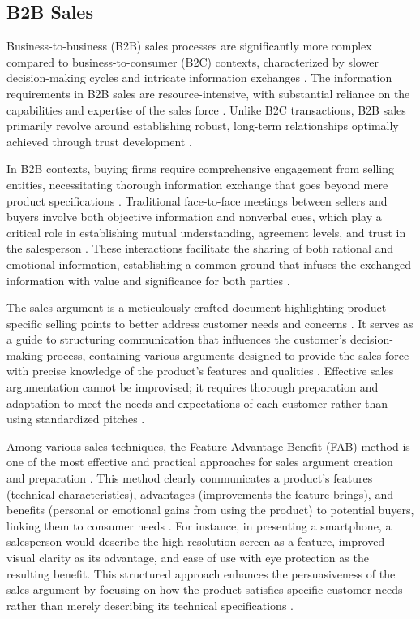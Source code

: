 \subsection{B2B Sales}

Business-to-business (B2B) sales processes are significantly more complex compared to business-to-consumer (B2C) contexts, characterized by slower decision-making cycles and intricate information exchanges \cite{rodriguez2020digitalization}. The information requirements in B2B sales are resource-intensive, with substantial reliance on the capabilities and expertise of the sales force \cite{agnihotri2012bringing}. Unlike B2C transactions, B2B sales primarily revolve around establishing robust, long-term relationships optimally achieved through trust development \cite{rodriguez2020digitalization}.

In B2B contexts, buying firms require comprehensive engagement from selling entities, necessitating thorough information exchange that goes beyond mere product specifications \cite{forsell2024competitive}. Traditional face-to-face meetings between sellers and buyers involve both objective information and nonverbal cues, which play a critical role in establishing mutual understanding, agreement levels, and trust in the salesperson \cite{rodriguez2020digitalization, morgan1994commitment}. These interactions facilitate the sharing of both rational and emotional information, establishing a common ground that infuses the exchanged information with value and significance for both parties \cite{rodriguez2020digitalization}.

The sales argument is a meticulously crafted document highlighting product-specific selling points to better address customer needs and concerns \cite{kotler2016marketing}. It serves as a guide to structuring communication that influences the customer's decision-making process, containing various arguments designed to provide the sales force with precise knowledge of the product's features and qualities \cite{elhissoufi2024leveraging}. Effective sales argumentation cannot be improvised; it requires thorough preparation and adaptation to meet the needs and expectations of each customer rather than using standardized pitches \cite{futrell2011fundamentals}.

Among various sales techniques, the Feature-Advantage-Benefit (FAB) method is one of the most effective and practical approaches for sales argument creation and preparation \cite{elhissoufi2024leveraging}. This method clearly communicates a product's features (technical characteristics), advantages (improvements the feature brings), and benefits (personal or emotional gains from using the product) to potential buyers, linking them to consumer needs \cite{futrell2011fundamentals}. For instance, in presenting a smartphone, a salesperson would describe the high-resolution screen as a feature, improved visual clarity as its advantage, and ease of use with eye protection as the resulting benefit. This structured approach enhances the persuasiveness of the sales argument by focusing on how the product satisfies specific customer needs rather than merely describing its technical specifications \cite{elhissoufi2024leveraging}.

